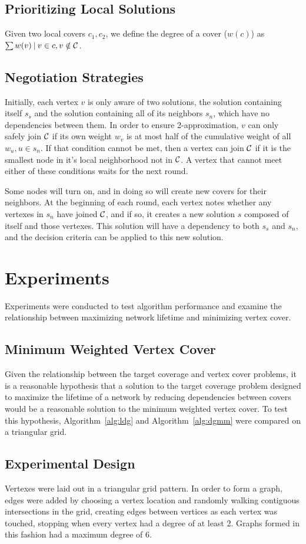 \subsection{Prioritizing Local Solutions}

Given two local covers $c_1, c_2$, we define the degree of a cover ($w(c)$) as $\sum w(v)\:|\: v \in c, v \notin {\mathcal C}$.  

\subsection{Negotiation Strategies}
Initially, each vertex $v$ is only aware of two solutions, the solution containing itself $s_s$ and the solution containing all of its neighbors $s_n$, which have no dependencies between them. In order to ensure 2-approximation, $v$ can only safely join ${\mathcal C}$ if its own weight $w_v$ is at most half of the cumulative weight of all $w_u, u \in s_n $. If that condition cannot be met, then a vertex can join ${\mathcal C}$ if it is the smallest node in it's local neighborhood not in ${\mathcal C}$. A vertex that cannot meet either of these conditions waits for the next round. 

Some nodes will turn on, and in doing so will create new covers for their neighbors. At the beginning of each round, each vertex notes whether any vertexes in $s_n$ have joined ${\mathcal C}$, and if so, it creates a new solution $s$ composed of itself and those vertexes. This solution will have a dependency to both $s_s$ and $s_n$, and the decision criteria can be applied to this new solution. 
\section{Experiments}
\label{sec:experiment}
Experiments were conducted to test algorithm performance and examine the relationship between maximizing network lifetime and minimizing vertex cover.
\subsection{Minimum Weighted Vertex Cover}
\label{sub:mwvc-exp}
Given the relationship between the target coverage and vertex cover problems, it is a reasonable hypothesis that a solution to the target coverage problem designed to maximize the lifetime of a network by reducing dependencies between covers would be a reasonable solution to the minimum weighted vertex cover. To test this hypothesis, Algorithm~\ref{alg:ldg} and Algorithm~\ref{alg:dgmm} were compared on a triangular grid.
\subsection{Experimental Design}
\label{sub:exp-design}
Vertexes were laid out in a triangular grid pattern. In order to form a graph, edges were added by choosing a vertex location and randomly walking contiguous intersections in the grid, creating edges between vertices  as each vertex was touched, stopping when every vertex had a degree of at least 2. Graphs formed in this fashion had a maximum degree of 6.

